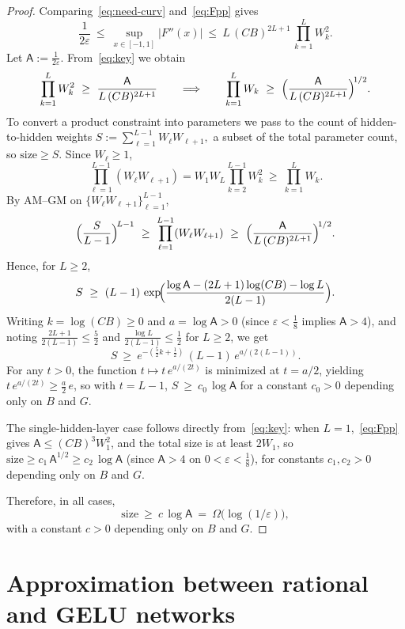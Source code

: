 \documentclass{article}
\theoremstyle{plain}
\theoremstyle{definition}
\theoremstyle{remark}
\begin{document}
\begin{proof}
Comparing~\cref{eq:need-curv} and~\cref{eq:Fpp} gives
\begin{equation}\label{eq:key}
\frac{1}{2\varepsilon}\ \le\ \sup_{x\in[-1,1]}|F''(x)|\ \le\ L\,(C B)^{2L+1}\,\prod_{k=1}^{L} W_k^{2}.
\end{equation}
Let $\mathsf{A}:=\tfrac{1}{2\varepsilon}$. From~\cref{eq:key} we obtain
\[
\prod_{k=1}^{L} W_k^{2}\ \ge\ \frac{\mathsf{A}}{L\,(C B)^{2L+1}}
\qquad\Longrightarrow\qquad
\prod_{k=1}^{L} W_k\ \ge\ \Bigl(\frac{\mathsf{A}}{L\,(C B)^{2L+1}}\Bigr)^{\!1/2}.
\]
To convert a product constraint into parameters we pass to the count of hidden-to-hidden weights \(
S:=\sum_{\ell=1}^{L-1} W_\ell W_{\ell+1},
\) a subset of the total parameter count, so $\mathrm{size}\ge S$. Since $W_\ell\ge1$,
\[
\prod_{\ell=1}^{L-1} (W_\ell W_{\ell+1})
= W_1 W_L \prod_{k=2}^{L-1} W_k^{2}
\ \ge\ \prod_{k=1}^{L} W_k.
\]
By AM--GM on $\{W_\ell W_{\ell+1}\}_{\ell=1}^{L-1}$,
\[
\Bigl(\frac{S}{L-1}\Bigr)^{\!L-1}\ \ge\ \prod_{\ell=1}^{L-1} (W_\ell W_{\ell+1})
\ \ge\ \Bigl(\frac{\mathsf{A}}{L\,(C B)^{2L+1}}\Bigr)^{\!1/2}.
\]
Hence, for $L\ge2$,
\[
S\ \ge\ (L-1)\,\exp\!\Bigl(\frac{\log \mathsf{A}-(2L+1)\log(CB)-\log L}{2(L-1)}\Bigr).
\]
Writing $k=\log(CB)\ge0$ and $a=\log \mathsf{A}>0$ (since $\varepsilon<\tfrac18$ implies $\mathsf{A}>4$), and noting $\tfrac{2L+1}{2(L-1)}\le \tfrac52$ and $\tfrac{\log L}{2(L-1)}\le \tfrac12$ for $L\ge2$, we get
\[
S\ \ge\ e^{-(\tfrac52 k+\tfrac12)}\,(L-1)\,e^{a/(2(L-1))}.
\]
For any $t>0$, the function $t\mapsto t\,e^{a/(2t)}$ is minimized at $t=a/2$, yielding $t\,e^{a/(2t)}\ge \tfrac{a}{2}\,e$, so with $t=L-1$, \(
S\ \ge\ c_0\,\log \mathsf{A}
\) for a constant $c_0>0$ depending only on $B$ and $G$.

The single-hidden-layer case follows directly from~\cref{eq:key}: when $L=1$,~\cref{eq:Fpp} gives $\mathsf{A}\le (C B)^3 W_1^2$, and the total size is at least $2W_1$, so $\mathrm{size}\ge c_1\,\mathsf{A}^{1/2}\ge c_2\,\log \mathsf{A}$ (since $\mathsf{A}>4$ on $0<\varepsilon<\tfrac18$), for constants $c_1,c_2>0$ depending only on $B$ and $G$.

Therefore, in all cases,
\[
\mathrm{size}\ \ge\ c\,\log \mathsf{A}\ =\ \Omega\bigl(\log(1/\varepsilon)\bigr),
\]
with a constant $c>0$ depending only on $B$ and $G$.
\end{proof}

\section{Approximation between rational and GELU networks}
\label{app:rational-gelu-nets}
\end{document}
